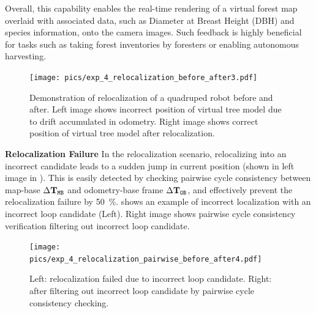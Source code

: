 Overall, this capability enables the real-time rendering of a virtual forest map overlaid with associated data, such as Diameter at Breast Height (DBH) and species information, onto the camera images. Such feedback is highly beneficial for tasks such as taking forest inventories by foresters or enabling autonomous harvesting. \vspace{1pt}
\begin{figure}[htbp]
  \centering
  \texttt{[image: pics/exp\_4\_relocalization\_before\_after3.pdf]}
  \caption{Demonstration of relocalization of a quadruped robot before and after. Left image shows incorrect position of virtual tree model due to drift accumulated in odometry. Right image shows correct position of virtual tree model after relocalization.}
  \label{fig:relocalization_before_after}
\end{figure}

\noindent\textbf{Relocalization Failure}\hspace{0.5em}
In the relocalization scenario, relocalizing into an incorrect candidate leads to a sudden jump in current position (shown in left image in ). This is easily detected by checking pairwise cycle consistency between map-base $\Delta\mathbf{T}_{\mathtt{M}\mathtt{B}}$ and odometry-base frame $\Delta\mathbf{T}_{\mathtt{O}\mathtt{B}}$, and effectively prevent the relocalization failure by \SI{50}{\percent}.  shows an example of incorrect localization with an incorrect loop candidate (Left). Right image shows pairwise cycle consistency verification filtering out incorrect loop candidate.
\begin{figure}[htbp]
  \centering
  \texttt{[image: pics/exp\_4\_relocalization\_pairwise\_before\_after4.pdf]}
  \caption{Left: relocalization failed due to incorrect loop candidate. Right: after filtering out incorrect loop candidate by pairwise cycle consistency checking.}
  \label{fig:relocalization_pairwise_cycle_consistency}
\end{figure}



